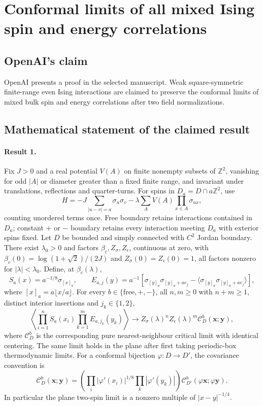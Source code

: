 \documentclass[11pt]{article}
\begin{document}
\section*{Conformal limits of all mixed Ising spin and energy correlations}

\subsection{OpenAI's claim}
OpenAI presents a proof in the selected manuscript. Weak square-symmetric finite-range even Ising interactions are claimed to preserve the conformal limits of mixed bulk spin and energy correlations after two field normalizations.

\subsection{Mathematical statement of the claimed result}
\paragraph{Result 1.} Fix $J>0$ and a real potential $V(A)$ on finite nonempty subsets of $\mathbb Z^2$, vanishing for odd $|A|$ or diameter greater than a fixed finite range, and invariant under translations, reflections and quarter-turns. For spins in $D_a=D\cap a\mathbb Z^2$, use
\[
 H=-J\sum_{|u-v|=a}\sigma_u\sigma_v-\lambda\sum_AV(A)\prod_{x\in A}\sigma_{ax},
\]
counting unordered terms once. Free boundary retains interactions contained in $D_a$; constant $+$ or $-$ boundary retains every interaction meeting $D_a$ with exterior spins fixed. Let $D$ be bounded and simply connected with $C^2$ Jordan boundary. There exist $\lambda_0>0$ and factors $\beta_c,Z_\sigma,Z_\epsilon$, continuous at zero, with $\beta_c(0)=\log(1+\sqrt2)/(2J)$ and $Z_\sigma(0)=Z_\epsilon(0)=1$, all factors nonzero for $|\lambda|<\lambda_0$. Define, at $\beta_c(\lambda)$,
\[
 S_a(x)=a^{-1/8}\sigma_{[x]_a},\qquad
 E_{a,j}(y)=a^{-1}[\sigma_{[y]_a}\sigma_{[y]_a+ae_j}
 -\langle\sigma_{[y]_a}\sigma_{[y]_a+ae_j}\rangle],
\]
where $[x]_a=a\lfloor x/a\rfloor$. For every $b\in\{\mathrm{free},+,-\}$, all $n,m\ge0$ with $n+m\ge1$, distinct interior insertions and $j_k\in\{1,2\}$,
\[
 \left\langle\prod_{i=1}^nS_a(x_i)\prod_{k=1}^mE_{a,j_k}(y_k)\right\rangle
 \longrightarrow Z_\sigma(\lambda)^nZ_\epsilon(\lambda)^m
 \mathcal C_D^b(\boldsymbol x;\boldsymbol y),
\]
where $\mathcal C_D^b$ is the corresponding pure nearest-neighbour critical limit with identical centering. The same limit holds in the plane after first taking periodic-box thermodynamic limits. For a conformal bijection $\varphi:D\to D'$, the covariance convention is
\[
 \mathcal C_D^b(\boldsymbol x;\boldsymbol y)=
 \left(\prod_i|\varphi'(x_i)|^{1/8}\prod_k|\varphi'(y_k)|\right)
 \mathcal C_{D'}^b(\varphi\boldsymbol x;\varphi\boldsymbol y).
\] In particular the plane two-spin limit is a nonzero multiple of $|x-y|^{-1/4}$.
\end{document}
